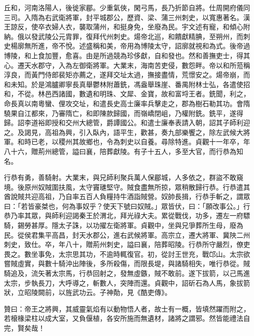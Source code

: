 \begin{pinyinscope}
 丘和，河南洛陽人，後徙家郿。少重氣俠，閑弓馬，長乃折節自將。仕周開府儀同三司。入隋為右武衛將軍，封平城郡公，歷資、梁、蒲三州刺史，以寬惠著名。漢王諒反，使卒衣婦人衣，襲取蒲州，和挺身免，坐廢為民。宇文述有寵，和傾心附納。俄以發武陵公元胄罪，復拜代州刺史。煬帝北巡，和饋獻精腆，至朔州，而刺史楊廓無所進，帝不悅。述盛稱和美，帝用為博陵太守，詔廓就視和為式。後帝過博陵，和上食加豐，愈喜。由是所過競為珍侈獻，自和發也。然和善撫吏士，得其心。遷天水郡守，入為左御衛將軍。大業末，海南苦吏侵，數怨畔。帝以和所蒞稱淳良，而黃門侍郎裴矩亦薦之，遂拜交址太過，撫接盡情，荒憬安之。煬帝崩，而和未知。於是鴻臚卿寧長真舉鬱林附蕭銑，馮盎舉珠崖、番禺附林士弘，各遣使招和，不從。林邑西諸國，數遺和明珠、文犀、金寶，故和富埒王者。銑聞，利之，命長真以南粵蠻、俚攻交址，和遣長史高士廉率兵擊走之，郡為樹石勒其功。會隋驍果自江都來，乃審隋亡，和即陳款歸國，而嶺嶠閉岨，乃權附銑。銑平，遂得歸。詔李道裕即授和交州大總管，爵譚國公。和遣士廉奉表請入朝，詔其子師利迎之。及謁見，高祖為興，引入臥內，語平生，歡甚，奏九部樂饗之，除左武候大將軍。和時已老，以稷州其故鄉也，令為刺史以自養。尋除特進。貞觀十一年卒，年八十六，贈荊州總管，謚曰襄，陪葬獻陵。有子十五人，多至大官，而行恭為知名。



 行恭有勇，善騎射。大業末，與兄師利聚兵萬人保郿城，人多依之，群盜不敢窺境。後原州奴賊圍扶風，太守竇璡堅守。賊食盡無所掠，眾稍散歸行恭。行恭遣其酋說賊共迎高祖，乃自率五百人負糧持牛酒詣賊營。奴帥長揖，行恭手斬之，謂眾曰：「若皆豪桀也，何為事奴乎？使天下號曰奴賊。」眾皆伏，曰：「願改事公。」行恭乃率其眾，與師利迎謁秦王於渭北，拜光祿大夫。累從戰伐，功多，遷左一府驃騎，錫勞甚厚。隱太子誅，以功擢左衛將軍。貞觀中，坐與兄爭葬所生母，廢為民。從侯君集平高昌，封天水郡公，進右武候將軍。高宗立，遷大將軍、冀陜二州刺史，致仕。卒，年八十，贈荊州刺史，謚曰襄，陪葬昭陵。行恭所守嚴烈，僚吏畏之。數坐事免，太宗思其功，不逾時輒復官。初，從討王世充，戰邙山。太宗欲嘗賊虛實，與數十騎沖出陣後，多所殺傷，而限長堤，與諸騎相失，唯行恭從。賊騎追及，流矢著太宗馬，行恭回射之，發無虛鏃，賊不敢前。遂下拔箭，以己馬進太宗，步執長刀，大呼導之，斬數人，突陣而還。貞觀中，詔斫石為人馬，象拔箭狀，立昭陵闕前，以旌武功云。子神勣，見《酷吏傳》。



 贊曰：帝王之將興，其威靈氣焰有以動物悟人者，故士有一概，皆填然躍而附之，若榱椽梁柱以成大室，又負偃植，各安所施而無遺材，諸將之謂邪。然皆能禮法自完，賢矣哉！



\end{pinyinscope}